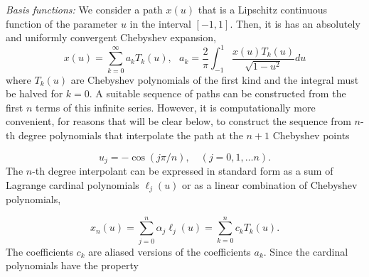 \emph{Basis functions: }We consider a path $x(u)$ that is a Lipschitz
continuous function of the parameter $u$ in the interval $[-1,1].$
Then, it is has an absolutely and uniformly convergent Chebyshev expansion,
\[
x(u)=\sum_{k=0}^{\infty}a_{k}T_{k}(u),\,\,\,\,a_{k}=\frac{2}{\pi}\int_{-1}^{1}\frac{x(u)T_{k}(u)}{\sqrt{1-u^{2}}}du
\]
where $T_{k}(u)$ are Chebyshev polynomials of the first kind and
the integral must be halved for $k=0$. A suitable sequence of paths
can be constructed from the first $n$ terms of this infinite series.
However, it is computationally more convenient, for reasons that will
be clear below, to construct the sequence from $n$-th degree polynomials
that interpolate the path at the $n+1$ Chebyshev points

\begin{equation}
u_{j}=-\cos(j\pi/n),\quad(j=0,1,\ldots n).
\end{equation}
The $n$-th degree interpolant can be expressed in standard form as
a sum of Lagrange cardinal polynomials $\ell_{j}(u)$ or as a linear
combination of Chebyshev polynomials,

\begin{equation}
x_{n}(u)=\sum_{j=0}^{n}\alpha_{j}\ell_{j}(u)=\sum_{k=0}^{n}c_{k}T_{k}(u).\label{eq:path-interpolation-expansion}
\end{equation}
The coefficients $c_{k}$ are aliased versions of the coefficients
$a_{k}$. Since the cardinal polynomials have the property

